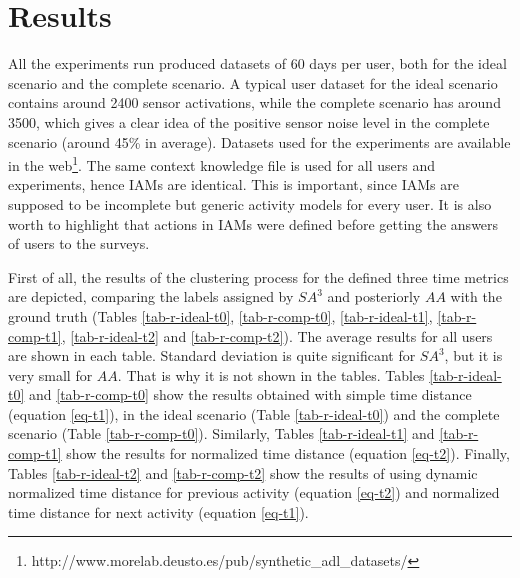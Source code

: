 \section{Results}
\label{sec:evaluation:results}

All the experiments run produced datasets of 60 days per user, both for the ideal scenario and the complete scenario. A typical user dataset for the ideal scenario contains around 2400 sensor activations, while the complete scenario has around 3500, which gives a clear idea of the positive sensor noise level in the complete scenario (around 45\% in average). Datasets used for the experiments are available in the web\footnote{http://www.morelab.deusto.es/pub/synthetic\_adl\_datasets/}. The same context knowledge file is used for all users and experiments, hence IAMs are identical. This is important, since IAMs are supposed to be incomplete but generic activity models for every user. It is also worth to highlight that actions in IAMs were defined before getting the answers of users to the surveys.

First of all, the results of the clustering process for the defined three time metrics are depicted, comparing the labels assigned by $SA^3$ and posteriorly $AA$ with the ground truth (Tables \ref{tab-r-ideal-t0}, \ref{tab-r-comp-t0}, \ref{tab-r-ideal-t1}, \ref{tab-r-comp-t1}, \ref{tab-r-ideal-t2} and \ref{tab-r-comp-t2}). The average results for all users are shown in each table. Standard deviation is quite significant for $SA^3$, but it is very small for $AA$. That is why it is not shown in the tables. Tables \ref{tab-r-ideal-t0} and \ref{tab-r-comp-t0} show the results obtained with simple time distance (equation \ref{eq-t1}), in the ideal scenario (Table \ref{tab-r-ideal-t0}) and the complete scenario (Table \ref{tab-r-comp-t0}). Similarly, Tables \ref{tab-r-ideal-t1} and \ref{tab-r-comp-t1} show the results for normalized time distance (equation \ref{eq-t2}). Finally, Tables \ref{tab-r-ideal-t2} and \ref{tab-r-comp-t2} show the results of using dynamic normalized time distance for previous activity (equation \ref{eq-t2}) and normalized time distance for next activity (equation \ref{eq-t1}).


